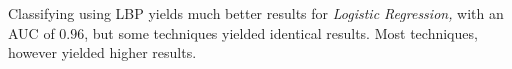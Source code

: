 \documentclass[letterpaper, notitlepage]{report}
\begin{document}

Classifying using LBP yields much better results for \textit{Logistic Regression,} with an AUC of $0.96$, but some techniques yielded identical results. Most techniques, however yielded higher results.
\begin{small}
\renewcommand{\arraystretch}{1.2}

\end{small}


%

%
%
%
\end{document}
